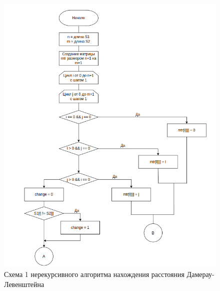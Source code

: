 \begin{figure}[h]
	\centering
	\includegraphics[width=\textwidth]{img/dliter1.png}
	\caption{Схема 1 нерекурсивного алгоритма нахождения расстояния Дамерау-Левенштейна}
	\label{fig:DLiter1}
\end{figure}

\clearpage

